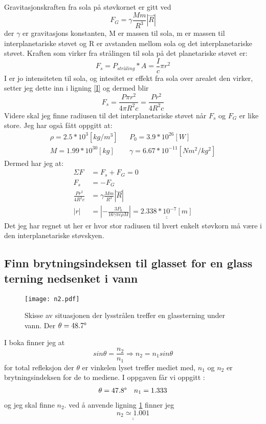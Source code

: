 \documentclass[a4paper,12pt,norsk]{article}
\newcommand{\uu}{\underline}
\newcommand{\ov}{\overset}
\begin{document}
Gravitasjonskraften fra sola på støvkornet er gitt ved 
\begin{equation}
F_G = \gamma\frac{Mm}{R^3}|\ov{\rightharpoonup}{R}|
\label{gravitasjon}
\end{equation}
der $\gamma$ er gravitasjons konstanten, M er massen til sola, m er massen til interplanetariske støvet og R er avstanden mellom sola og det interplanetariske støvet. 
Kraften som virker fra strålingen til sola på det planetariske støvet er:
\begin{equation}
F_s = P_{stråling}*A = \frac{I}{c}\pi r^2
\label{I}
\end{equation}
I er jo intensiteten til sola, og intesitet er effekt fra sola over arealet den virker, setter jeg dette inn i ligning \ref{I} og dermed blir 
$$
F_s = \frac{P\pi r^2}{4\pi R^2c} = \frac{Pr^2}{4R^2c}
$$
Videre skal jeg finne radiusen til det interplanetariske støvet når $F_s$ og $F_G$ er like store. Jeg har også fått oppgitt at:
\begin{align*}
\rho = 2.5*10^3 [kg/m^3] && P_0 = 3.9*10^{26}[W]\\
M = 1.99*10^{30}[kg] && \gamma =6.67*10^{-11}[Nm^2/kg^2]
\end{align*}
Dermed har jeg at:
\begin{align*}
\Sigma F &= F_s +F_G = 0\\ 
F_s &= -F_G\\
\frac{Pr^2}{4R^2c} &=  \gamma\frac{Mm}{R^3}|\ov{\rightharpoonup}{R}|\\
|r| & = |-\frac{3P_0}{16\gamma\pi c\rho M}| = \uu{\uu{2.338*10^{-7}[m]}}
\end{align*}
Det jeg har regnet ut her er hvor stor radiusen til hvert enkelt støvkorn må være i den interplanetariske støvskyen. 

\subsection{Finn brytningsindeksen til glasset for en glass terning nedsenket i vann}
\begin{figure}
\texttt{[image: n2.pdf]} 
\caption[Skisse av lys mot glass under vann]{Skisse av situasjonen der lysstrålen treffer en glassterning under vann. Der $\theta = 48.7\degree$}
\label{n2}
\end{figure}


I boka \cite{boka} finner jeg at
\begin{equation}
sin\theta= \frac{n_2}{n_1} \Rightarrow n_2= n_1sin\theta
\label{n2}
\end{equation}
for total refleksjon der $\theta$ er vinkelen lyset treffer mediet med, $n_1$ og $n_2$ er brytningsindeksen for de to mediene.
I oppgaven får vi oppgitt :
\begin{align*}
\theta = 47.8\degree && n_1 = 1.333
\end{align*}
og jeg skal finne $n_2$. ved å anvende ligning \ref{n2} finner jeg
$$
\uu{\uu{n_2 \simeq 1.001}}
$$
\end{document}
